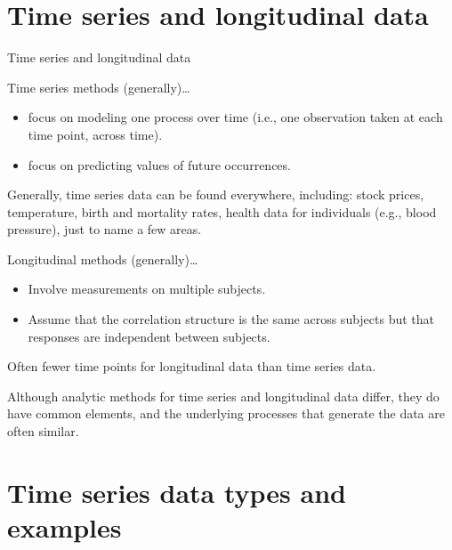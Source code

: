 \documentclass[
  9pt,
  ignorenonframetext,
]{beamer}
\begin{document}
\hypertarget{time-series-and-longitudinal-data}{%
\section{Time series and longitudinal
data}\label{time-series-and-longitudinal-data}}

\begin{frame}{Time series and longitudinal data}
\protect\hypertarget{time-series-and-longitudinal-data-1}{}
\begin{block}{Time series methods (generally)\ldots{}}
\protect\hypertarget{time-series-methods-generally}{}
\begin{itemize}
\item
  focus on modeling one process over time (i.e., one observation taken
  at each time point, across time).
\item
  focus on predicting values of future occurrences.
\end{itemize}

Generally, time series data can be found everywhere, including: stock
prices, temperature, birth and mortality rates, health data for
individuals (e.g., blood pressure), just to name a few areas.
\end{block}

\begin{block}{Longitudinal methods (generally)\ldots{}}
\protect\hypertarget{longitudinal-methods-generally}{}
\begin{itemize}
\item
  Involve measurements on multiple subjects.
\item
  Assume that the correlation structure is the same across subjects but
  that responses are independent between subjects.
\end{itemize}

Often fewer time points for longitudinal data than time series data.

Although analytic methods for time series and longitudinal data differ,
they do have common elements, and the underlying processes that generate
the data are often similar.  
\end{block}
\end{frame}

\hypertarget{time-series-data-types-and-examples}{%
\section{Time series data types and
examples}\label{time-series-data-types-and-examples}}
\end{document}
